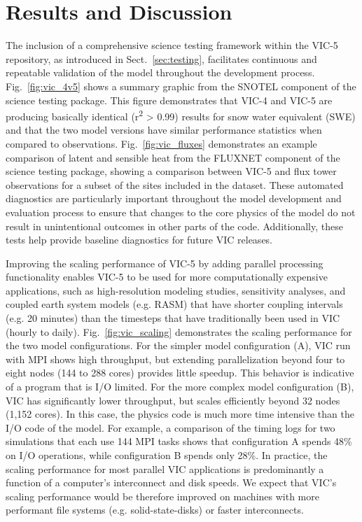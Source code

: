 \documentclass[gmd, manuscript]{copernicus}
\begin{document}
\section{Results and Discussion}
  \label{sec:results}
  The inclusion of a comprehensive science testing framework within the VIC-5 repository, as introduced in Sect.~\ref{sec:testing}, facilitates continuous and repeatable validation of the model throughout the development process. Fig.~\ref{fig:vic_4v5} shows a summary graphic from the SNOTEL component of the science testing package. This figure demonstrates that VIC-4 and VIC-5 are producing basically identical (r\textsuperscript{2} > 0.99) results for snow water equivalent (SWE) and that the two model versions have similar performance statistics when compared to observations. Fig.~\ref{fig:vic_fluxes} demonstrates an example comparison of latent and sensible heat from the FLUXNET component of the science testing package, showing a comparison between VIC-5 and flux tower observations for a subset of the sites included in the dataset. These automated diagnostics are particularly important throughout the model development and evaluation process to ensure that changes to the core physics of the model do not result in unintentional outcomes in other parts of the code. Additionally, these tests help provide baseline diagnostics for future VIC releases.

  Improving the scaling performance of VIC-5 by adding parallel processing functionality enables VIC-5 to be used for more computationally expensive applications, such as high-resolution modeling studies, sensitivity analyses, and coupled earth system models (e.g. RASM) that have shorter coupling intervals (e.g. 20 minutes) than the timesteps that have traditionally been used in VIC (hourly to daily). Fig.~\ref{fig:vic_scaling} demonstrates the scaling performance for the two model configurations. For the simpler model configuration (A), VIC run with MPI shows high throughput, but extending parallelization beyond four to eight nodes (144 to 288 cores) provides little speedup. This behavior is indicative of a program that is I/O limited. For the more complex model configuration (B), VIC has significantly lower throughput, but scales efficiently beyond 32 nodes (1,152 cores). In this case, the physics code is much more time intensive than the I/O code of the model. For example, a comparison of the timing logs for two simulations that each use 144 MPI tasks shows that configuration A spends 48\% on I/O operations, while configuration B spends only 28\%. In practice, the scaling performance for most parallel VIC applications is predominantly a function of a computer's interconnect and disk speeds. We expect that VIC's scaling performance would be therefore improved on machines with more performant file systems (e.g. solid-state-disks) or faster interconnects.
\end{document}
